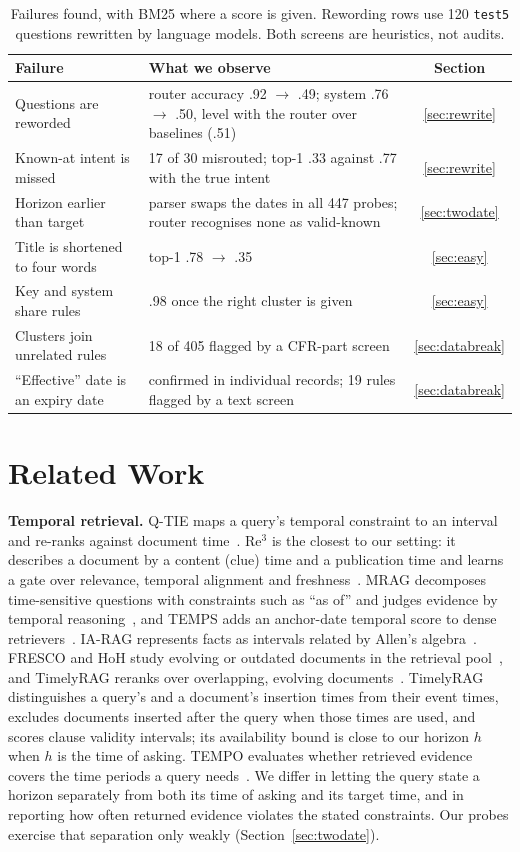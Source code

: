 \documentclass[11pt]{article}
\begin{document}
\begin{table}[t]\centering\footnotesize
\begin{tabular}{p{}p{}c}\toprule
Failure & What we observe & Section \\\midrule
Questions are reworded & router accuracy .92 $\rightarrow$ .49; system .76 $\rightarrow$ .50, level with the router over baselines (.51) & \ref{sec:rewrite} \\
Known-at intent is missed & 17 of 30 misrouted; top-1 .33 against .77 with the true intent & \ref{sec:rewrite} \\
Horizon earlier than target & parser swaps the dates in all 447 probes; router recognises none as valid-known & \ref{sec:twodate} \\
Title is shortened to four words & top-1 .78 $\rightarrow$ .35 & \ref{sec:easy} \\
Key and system share rules & .98 once the right cluster is given & \ref{sec:easy} \\
Clusters join unrelated rules & 18 of 405 flagged by a CFR-part screen & \ref{sec:databreak} \\
``Effective'' date is an expiry date & confirmed in individual records; 19 rules flagged by a text screen & \ref{sec:databreak} \\\bottomrule
\end{tabular}
\caption{Failures found, with BM25 where a score is given. Rewording rows use 120 \texttt{test5} questions rewritten by language models. Both screens are heuristics, not audits.}\label{tab:failures}
\end{table}

\section{Related Work}
\textbf{Temporal retrieval.} Q-TIE maps a query's temporal constraint to an interval and re-ranks against document time~\cite{qtie2026}. Re$^3$ is the closest to our setting: it describes a document by a content (clue) time and a publication time and learns a gate over relevance, temporal alignment and freshness~\cite{re32025}. MRAG decomposes time-sensitive questions with constraints such as ``as of'' and judges evidence by temporal reasoning~\cite{mrag2025}, and TEMPS adds an anchor-date temporal score to dense retrievers~\cite{temps2026}. IA-RAG represents facts as intervals related by Allen's algebra~\cite{iarag2026}. FRESCO and HoH study evolving or outdated documents in the retrieval pool~\cite{fresco2026,hoh2025}, and TimelyRAG reranks over overlapping, evolving documents~\cite{timelyrag2026}. TimelyRAG distinguishes a query's and a document's insertion times from their event times, excludes documents inserted after the query when those times are used, and scores clause validity intervals; its availability bound is close to our horizon $h$ when $h$ is the time of asking. TEMPO evaluates whether retrieved evidence covers the time periods a query needs~\cite{tempo2026}. We differ in letting the query state a horizon separately from both its time of asking and its target time, and in reporting how often returned evidence violates the stated constraints. Our probes exercise that separation only weakly (Section~\ref{sec:twodate}).
\end{document}
